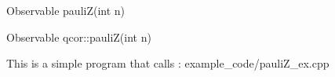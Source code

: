 
\begin{apidefinition}

\begin{Csynopsis}
    Observable pauliZ(int n)
\end{Csynopsis}

\begin{Cppsynopsis}
    Observable qcor::pauliZ(int n)
\end{Cppsynopsis}


\begin{apiarguments}
\end{apiarguments}



\apinotes{
    
}

\begin{apiexamples}

\apicppexample
    { This is a simple program that calls : } 
    { example_code/pauliZ_ex.cpp} 
    {}

\end{apiexamples}

\end{apidefinition}
